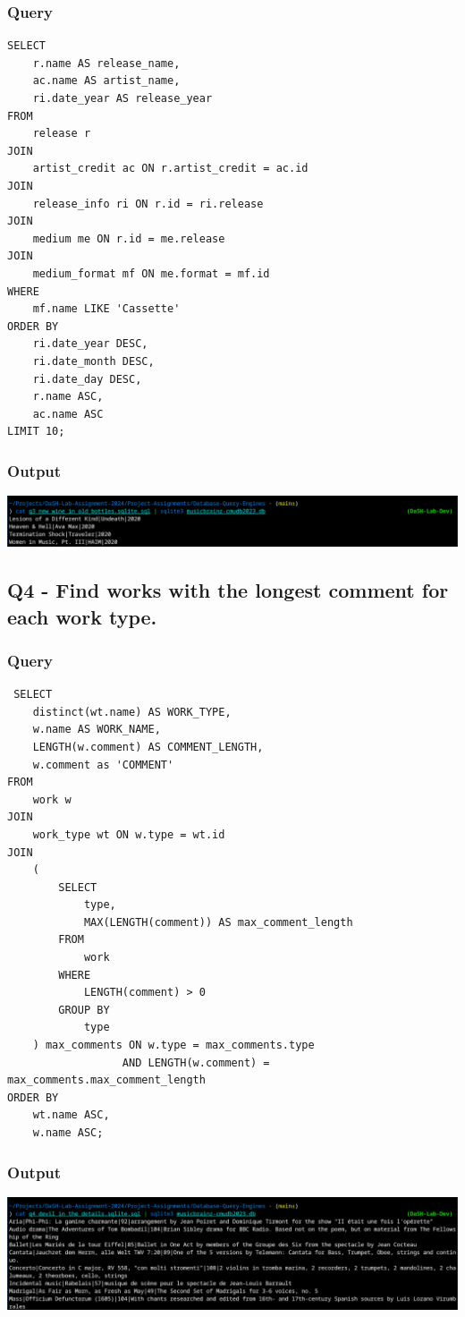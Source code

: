 \documentclass[11pt]{article}
\begin{document}
\subsubsection{Query}
\label{sec:org83974b6}
\begin{verbatim}
SELECT
    r.name AS release_name,
    ac.name AS artist_name,
    ri.date_year AS release_year
FROM
    release r
JOIN
    artist_credit ac ON r.artist_credit = ac.id
JOIN
    release_info ri ON r.id = ri.release
JOIN
    medium me ON r.id = me.release
JOIN
    medium_format mf ON me.format = mf.id
WHERE
    mf.name LIKE 'Cassette'
ORDER BY
    ri.date_year DESC,
    ri.date_month DESC,
    ri.date_day DESC,
    r.name ASC,
    ac.name ASC
LIMIT 10;

\end{verbatim}
\subsubsection{Output}
\label{sec:orga536439}
\begin{center}
\includegraphics[width=.9\linewidth]{./images/Q3.png}
\end{center}
\subsection{Q4 - Find works with the longest comment for each work type.}
\label{sec:org49b3a9b}
\subsubsection{Query}
\label{sec:orgceb0db2}
\begin{verbatim}
 SELECT
    distinct(wt.name) AS WORK_TYPE,
    w.name AS WORK_NAME,
    LENGTH(w.comment) AS COMMENT_LENGTH,
    w.comment as 'COMMENT'
FROM
    work w
JOIN
    work_type wt ON w.type = wt.id
JOIN
    (
        SELECT
            type,
            MAX(LENGTH(comment)) AS max_comment_length
        FROM
            work
        WHERE
            LENGTH(comment) > 0
        GROUP BY
            type
    ) max_comments ON w.type = max_comments.type
                  AND LENGTH(w.comment) = max_comments.max_comment_length
ORDER BY
    wt.name ASC,
    w.name ASC;
\end{verbatim}
\subsubsection{Output}
\label{sec:orged4ffdd}
\begin{center}
\includegraphics[width=.9\linewidth]{./images/Q4.png}
\end{center}
\end{document}
